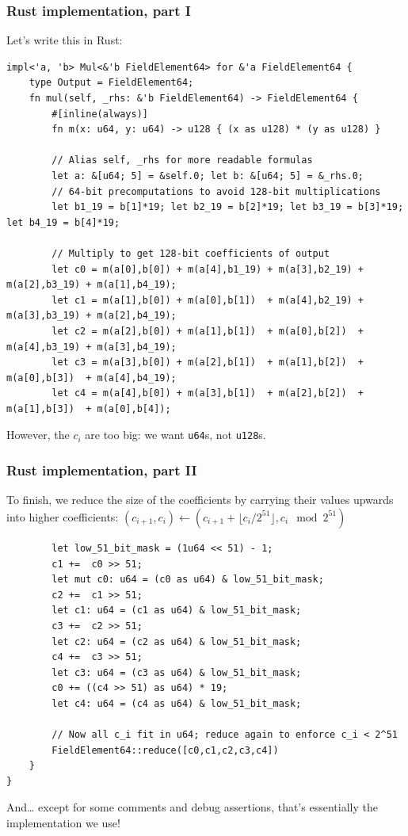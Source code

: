 \documentclass[xetex,aspectratio=169]{beamer}
\begin{document}
\begin{frame}[fragile]
    \frametitle{Rust implementation, part I}
    Let's write this in Rust:
    {\tiny
    \begin{verbatim}
impl<'a, 'b> Mul<&'b FieldElement64> for &'a FieldElement64 {
    type Output = FieldElement64;                            
    fn mul(self, _rhs: &'b FieldElement64) -> FieldElement64 {                                          
        #[inline(always)]                                                                               
        fn m(x: u64, y: u64) -> u128 { (x as u128) * (y as u128) }                                      
    
        // Alias self, _rhs for more readable formulas                                                  
        let a: &[u64; 5] = &self.0; let b: &[u64; 5] = &_rhs.0;                                         
        // 64-bit precomputations to avoid 128-bit multiplications                                      
        let b1_19 = b[1]*19; let b2_19 = b[2]*19; let b3_19 = b[3]*19; let b4_19 = b[4]*19;     
    
        // Multiply to get 128-bit coefficients of output                                               
        let c0 = m(a[0],b[0]) + m(a[4],b1_19) + m(a[3],b2_19) + m(a[2],b3_19) + m(a[1],b4_19);
        let c1 = m(a[1],b[0]) + m(a[0],b[1])  + m(a[4],b2_19) + m(a[3],b3_19) + m(a[2],b4_19);
        let c2 = m(a[2],b[0]) + m(a[1],b[1])  + m(a[0],b[2])  + m(a[4],b3_19) + m(a[3],b4_19);
        let c3 = m(a[3],b[0]) + m(a[2],b[1])  + m(a[1],b[2])  + m(a[0],b[3])  + m(a[4],b4_19);
        let c4 = m(a[4],b[0]) + m(a[3],b[1])  + m(a[2],b[2])  + m(a[1],b[3])  + m(a[0],b[4]); 
    \end{verbatim}
    }
    \pause However, the $c_i$ are too big: we want \texttt{u64}s, not \texttt{u128}s.
\end{frame}
  
\begin{frame}[fragile]
    \frametitle{Rust implementation, part II}
    To finish, we reduce the size of the coefficients by carrying their values upwards into higher coefficients:
    $(c_{i+1}, c_i) \leftarrow (c_{i+1} + \lfloor c_i / 2^{51} \rfloor, c_i \mod 2^{51})$
    \pause
    {\tiny
    \begin{verbatim}
        let low_51_bit_mask = (1u64 << 51) - 1;
        c1 +=  c0 >> 51;
        let mut c0: u64 = (c0 as u64) & low_51_bit_mask;
        c2 +=  c1 >> 51;
        let c1: u64 = (c1 as u64) & low_51_bit_mask;
        c3 +=  c2 >> 51;
        let c2: u64 = (c2 as u64) & low_51_bit_mask;
        c4 +=  c3 >> 51;
        let c3: u64 = (c3 as u64) & low_51_bit_mask;
        c0 += ((c4 >> 51) as u64) * 19;
        let c4: u64 = (c4 as u64) & low_51_bit_mask;

        // Now all c_i fit in u64; reduce again to enforce c_i < 2^51
        FieldElement64::reduce([c0,c1,c2,c3,c4])
    }
}
    \end{verbatim}
    }
    \vspace{-12pt}
    \pause And… except for some comments and debug assertions, that’s essentially the implementation we use!
\end{frame}
\end{document}
